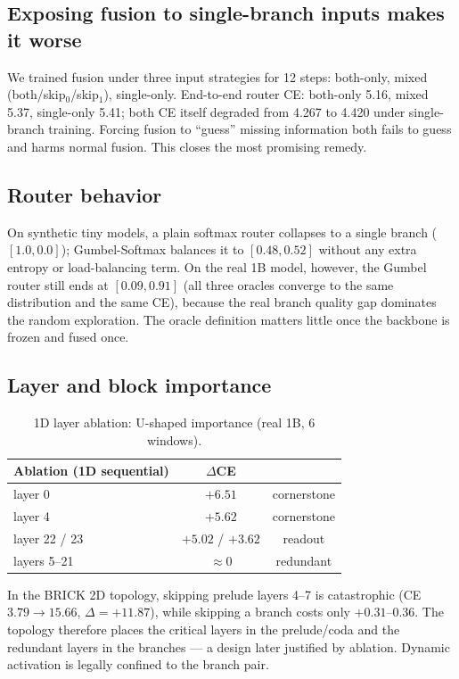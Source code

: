 \documentclass[11pt,a4paper]{article}
\begin{document}
\subsection{Exposing fusion to single-branch inputs makes it worse}
We trained fusion under three input strategies for 12 steps: both-only, mixed
(both/skip$_0$/skip$_1$), single-only. End-to-end router CE:
both-only 5.16, mixed 5.37, single-only 5.41; both CE itself degraded from 4.267 to
4.420 under single-branch training. Forcing fusion to ``guess'' missing information
both fails to guess and harms normal fusion. This closes the most promising remedy.

\subsection{Router behavior}
On synthetic tiny models, a plain softmax router collapses to a single branch
($[1.0,0.0]$); Gumbel-Softmax balances it to $[0.48,0.52]$ without any extra entropy
or load-balancing term. On the real 1B model, however, the Gumbel router still ends at
$[0.09,0.91]$ (all three oracles converge to the same distribution and the same CE),
because the real branch quality gap dominates the random exploration. The oracle
definition matters little once the backbone is frozen and fused once.

\subsection{Layer and block importance}
\begin{table}[h]
\centering
\begin{tabular}{lcc}
\toprule
Ablation (1D sequential) & $\Delta$CE & \\ \midrule
layer 0 & $+6.51$ & cornerstone \\
layer 4 & $+5.62$ & cornerstone \\
layer 22 / 23 & $+5.02$ / $+3.62$ & readout \\
layers 5--21 & $\approx 0$ & redundant \\
\bottomrule
\end{tabular}
\caption{1D layer ablation: U-shaped importance (real 1B, 6 windows).}
\end{table}
In the BRICK 2D topology, skipping prelude layers 4--7 is catastrophic
(CE $3.79\to15.66$, $\Delta=+11.87$), while skipping a branch costs only
$+0.31$--$0.36$. The topology therefore places the critical layers in the
prelude/coda and the redundant layers in the branches --- a design later justified
by ablation. Dynamic activation is legally confined to the branch pair.
\end{document}
